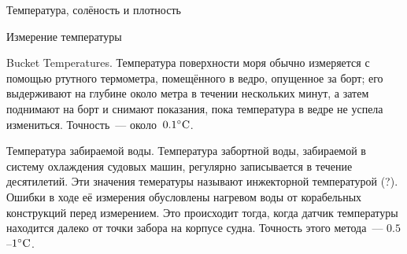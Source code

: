 \begin{chapter}{Температура, солёность и плотность}
\begin{section}{Измерение температуры}
\begin{paragraph}{Bucket Temperatures.}
Температура поверхности моря обычно измеряется с помощью ртутного
термометра, помещённого в ведро, опущенное за борт; его выдерживают на
глубине около метра в течении нескольких минут, а затем поднимают на
борт и снимают показания, пока температура в ведре не успела
измениться. Точность~--- около~${0.1}^\circ\mbox{C}$.
%
\end{paragraph}

\begin{paragraph}{Температура забираемой воды.}
Температура забортной воды, забираемой в систему охлаждения судовых машин,
регулярно записывается в течение десятилетий. Эти значения темературы называют
инжекторной температурой (?). Ошибки в ходе её измерения обусловлены нагревом
воды от корабельных конструкций перед измерением. Это происходит тогда,
когда датчик температуры находится далеко от точки забора на корпусе судна.
Точность этого метода~--- $0.5$--${1}^\circ\mbox{C}$.
%
\end{paragraph}


\end{section}
\end{chapter}
